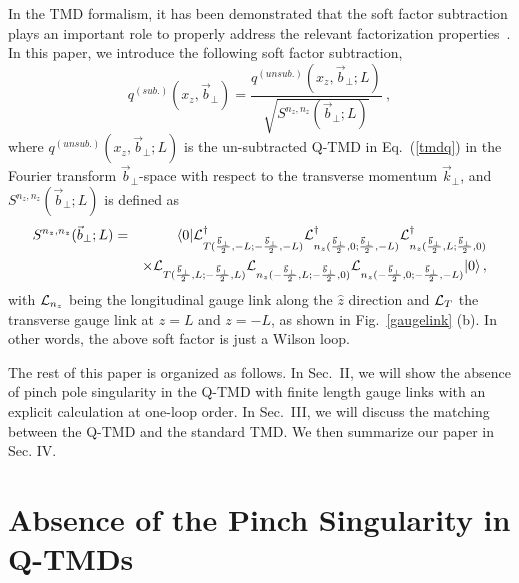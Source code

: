 \documentclass[aps,prd,preprint,tightenlines,superscriptaddress,nofootinbib]{revtex4}
\begin{document}
In the TMD formalism, it has been demonstrated that the soft factor subtraction plays
an important role to properly address the relevant factorization properties~\cite{Collins}. 
In this paper, we introduce the following soft factor subtraction, 
\begin{equation}
q^{(sub.)}(x_z,{\vec b}_\perp)=\frac{q^{(unsub.)}(x_z,{\vec b}_\perp;L)}{\sqrt{S^{n_z, n_z}({\vec b}_\perp;L)}}\ , \label{tmd}
\end{equation}
where $q^{(unsub.)}(x_z,{\vec b}_\perp; L)$ is the un-subtracted Q-TMD
in Eq.~(\ref{tmdq}) in the Fourier transform ${\vec b}_\perp$-space with respect to the
transverse momentum ${\vec k}_\perp$, and $S^{n_z, n_z}({\vec b}_\perp; L)$ is defined as
\begin{eqnarray}
S^{n_z, n_z}({\vec b}_\perp;L)&=&{\langle 0|{\cal L}_{T(\frac{{\vec b}_\perp}{2},-L;-\frac{{\vec b}_\perp}{2},-L)}^\dagger{\cal L}_{n_z(\frac{{\vec b}_\perp}{2},0;\frac{{\vec b}_\perp}{2},-L)}^\dagger
{\cal L}_{n_z(\frac{{\vec b}_\perp}{2},L;\frac{{\vec b}_\perp}{2},0)}^\dagger}\nonumber\\
&&\times {{\cal L}_{T(\frac{{\vec b}_\perp}{2},L;-\frac{{\vec b}_\perp}{2},L)} {\cal
L}_{ n_z(-\frac{{\vec b}_\perp}{2},L;-\frac{{\vec b}_\perp}{2},0)} {\cal L}_{n_z(-\frac{{\vec b}_\perp}{2},0;-\frac{{\vec b}_\perp}{2},-L)} |0\rangle   }\, , \label{softg}
\end{eqnarray}
with ${\cal L}_{n_z}$ being the longitudinal gauge link along the $\hat z$ direction and ${\cal L}_T$
the transverse gauge link at $z=L$ and $z=-L$, as shown in Fig.~\ref{gaugelink} (b). In other words, the above
soft factor is just a Wilson loop. 

The rest of this paper is organized as follows. In Sec.~II, we will
show the absence of pinch pole singularity in the Q-TMD with finite length gauge links with an explicit calculation
at one-loop order. In Sec.~III, we will discuss the matching between
the Q-TMD and the standard TMD. We then summarize our paper in Sec. IV.

\section{Absence of the Pinch Singularity in Q-TMDs}
\end{document}
